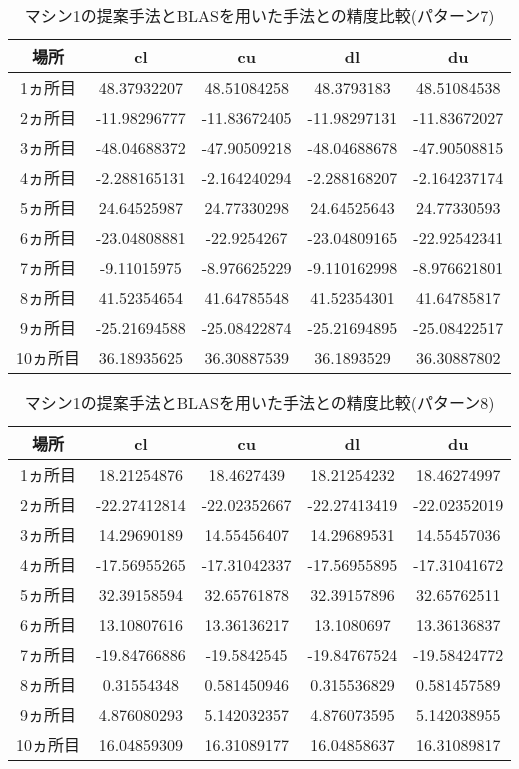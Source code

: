 \documentclass[11pt,a4paper]{jsreport}
\theoremstyle{definition}
\begin{document}
\begin{table}[H]
\centering
\begin{tabular}{|c|c|c|c|c|}
\hline
場所 & cl & cu & dl & du \\ \hline
1ヵ所目 & 48.37932207 & 48.51084258 & 48.3793183 & 48.51084538 \\ \hline
2ヵ所目 & -11.98296777 & -11.83672405 & -11.98297131 & -11.83672027 \\ \hline
3ヵ所目 & -48.04688372 & -47.90509218 & -48.04688678 & -47.90508815 \\ \hline
4ヵ所目 & -2.288165131 & -2.164240294 & -2.288168207 & -2.164237174 \\ \hline
5ヵ所目 & 24.64525987 & 24.77330298 & 24.64525643 & 24.77330593 \\ \hline
6ヵ所目 & -23.04808881 & -22.9254267 & -23.04809165 & -22.92542341 \\ \hline
7ヵ所目 & -9.11015975 & -8.976625229 & -9.110162998 & -8.976621801 \\ \hline
8ヵ所目 & 41.52354654 & 41.64785548 & 41.52354301 & 41.64785817 \\ \hline
9ヵ所目 & -25.21694588 & -25.08422874 & -25.21694895 & -25.08422517 \\ \hline
10ヵ所目 & 36.18935625 & 36.30887539 & 36.1893529 & 36.30887802 \\ \hline
\end{tabular}
\caption{マシン1の提案手法とBLASを用いた手法との精度比較(パターン7)}
\end{table}

\begin{table}[H]
\centering
\begin{tabular}{|c|c|c|c|c|}
\hline
場所 & cl & cu & dl & du \\ \hline
1ヵ所目 & 18.21254876 & 18.4627439 & 18.21254232 & 18.46274997 \\ \hline
2ヵ所目 & -22.27412814 & -22.02352667 & -22.27413419 & -22.02352019 \\ \hline
3ヵ所目 & 14.29690189 & 14.55456407 & 14.29689531 & 14.55457036 \\ \hline
4ヵ所目 & -17.56955265 & -17.31042337 & -17.56955895 & -17.31041672 \\ \hline
5ヵ所目 & 32.39158594 & 32.65761878 & 32.39157896 & 32.65762511 \\ \hline
6ヵ所目 & 13.10807616 & 13.36136217 & 13.1080697 & 13.36136837 \\ \hline
7ヵ所目 & -19.84766886 & -19.5842545 & -19.84767524 & -19.58424772 \\ \hline
8ヵ所目 & 0.31554348 & 0.581450946 & 0.315536829 & 0.581457589 \\ \hline
9ヵ所目 & 4.876080293 & 5.142032357 & 4.876073595 & 5.142038955 \\ \hline
10ヵ所目 & 16.04859309 & 16.31089177 & 16.04858637 & 16.31089817 \\ \hline
\end{tabular}
\caption{マシン1の提案手法とBLASを用いた手法との精度比較(パターン8)}
\end{table}
\end{document}
